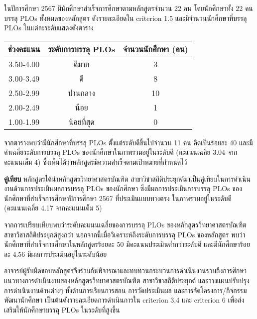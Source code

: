 ในปีการศึกษา 2567 มีนักศึกษาสำเร็จการศึกษาตามหลักสูตรจำนวน 22 คน โดยนักศึกษาทั้ง 22 คน
บรรลุ PLOs ทั้งหมดของหลักสูตร ดังรายละเอียดใน criterion 1.5  และมีจำนวนนักศึกษาที่บรรลุ PLOs ในแต่ละระดับแสดงดังตาราง
\begin{center}
	\begin{tabular}{|c|c|c|}
		\hline
		\textbf{ช่วงคะแนน}&\textbf{ระดับการบรรลุ PLOs}&\textbf{จำนวนนักศึกษา (คน)}\\\hline
		3.50-4.00&ดีมาก&3\\\hline
		3.00-3.49&ดี&8\\\hline
		2.50-2.99&ปานกลาง&10\\\hline
		2.00-2.49&น้อย&1\\\hline
		1.00-1.99&น้อยที่สุด&0\\\hline
	\end{tabular}
\end{center}

จากตารางพบว่ามีนักศึกษาที่บรรลุ PLOs ตั้้งแต่ระดับดีขึ้นไปจำนวน 11 คน คิดเป็นร้อยละ 40 และมีค่าเฉลี่ยระดับการบรรลุ PLOs ของนักศึกษาในภาพรวมอยู่ในระดับดี (คะแนนเฉลี่ย 3.04 จากคะแนนเต็ม 4) ซึ่งเห็นได้ว่าหลักสูตรมีความสำเร็จตามเป้าหมายที่กำหนดไว้


\textbf{คู่เทียบ} หลักสูตรได้นำหลักสูตรวิทยาศาสตรบัณฑิต  สาขาวิชาสถิติประยุกต์มาเป็นคู่เทียบในการดำเนินงานด้านการประเมินผลการบรรลุ PLOs ของนักศึกษา ซึ่งมีผลการประเมินการบรรลุ PLOs ของนักศึกษาที่สำเร็จการศึกษาปีการศึกษา 2567 ที่ประเมินแบบทางตรง ในภาพรวมอยู่ในระดับดี (คะแนนเฉลี่ย 4.17 จากคะแนนเต็ม 5)

จากการเปรียบเทียบพบว่าระดับคะแนนเฉลี่ยของการบรรลุ PLOs ของหลักสูตรวิทยาศาสตรบัณฑิต สาขาวิชาสถิติประยุกต์สูงกว่า นอกจากนี้เมื่อวิเคราะห์ถึงระดับการบรรลุ PLOs ของหลักสูตร พบว่านักศึกษาที่สำเร็จการศึกษาในหลักสูตรร้อยละ 50 มีคะแนนประเมินต่ำกว่าระดับดี และมีนักศึกษาร้อยละ 4.56 มีผลการประเมินอยู่ในระดับน้อย 

อาจารย์ผู้รับผิดชอบหลักสูตรจึงร่วมกันพิจารณาและทบทวนกระบวนการดำเนินงานรวมถึงการศึกษาแนวทางการดำเนินงานของหลักสูตรวิทยาศาสตรบัณฑิต สาขาวิชาสถิติประยุกต์ และวางแผนปรับปรุงการดำเนินงานด้านต่างๆ ทั้งด้านการเรียนการสอน การวัดประเมินผล และการจัดโครงการ/กิจกรรมพัฒนานักศึกษา เป็นต้นดังรายละเอียดการดำเนินการใน criterion 3,4 และ criterion 6 เพื่อส่งเสริมให้นักศึกษาบรรลุ PLOs ในระดับที่สูงขึ้น


\begin{doclist}
\end{doclist}












